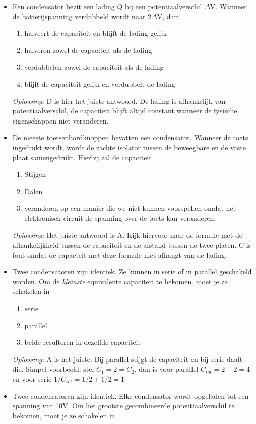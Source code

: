 \documentclass[12pt,a4paper]{article}
\begin{document}
\begin{itemize}
	\item Een condensator bezit een lading Q bij een potentiaalverschil $\Delta$V. Wanneer de batterijspanning verdubbeld wordt naar 2$\Delta$V, dan:
	\begin{enumerate}[label=\alph*]
		\item halveert de capaciteit en blijft de lading gelijk
		\item halveren zowel de capaciteit als de lading
		\item verdubbelen zowel de capaciteit als de lading
		\item blijft de capaciteit gelijk en verdubbelt de lading
	\end{enumerate}
	\textit{Oplossing:} D is hier het juiste antwoord. De lading is afhankelijk van potentiaalverschil, de capaciteit blijft altijd constant wanneer de fysische eigenschappen niet veranderen.
	\item De meeste toetsenbordknoppen bevatten een condensator. Wanneer de toets ingedrukt wordt, wordt de zachte isolator tussen de beweegbare en de vaste plaat samengedrukt. Hierbij zal de capaciteit
	\begin{enumerate}[label=\alph*]
		\item Stijgen
		\item Dalen
		\item veranderen op een manier die we niet kunnen voorspellen omdat het elektronisch circuit de spanning over de toets kan veranderen. 
	\end{enumerate}
	\textit{Oplossing:} Het juiste antwoord is A. Kijk hiervoor naar de formule met de afhankelijkheid tussen de capaciteit en de afstand tussen de twee platen. C is fout omdat de capacteit met deze formule niet afhangt van de lading. 
	\item Twee condensatoren zijn identiek. Ze kunnen in serie of in parallel geschakeld worden. Om de \textit{kleinste} equivalente capaciteit te bekomen, moet je ze schakelen in
	\begin{enumerate}[label=\alph*]
		\item serie
		\item parallel
		\item beide resulteren in dezelfde capaciteit
	\end{enumerate}
	\textit{Oplossing:} A is het juiste. Bij parallel stijgt de capaciteit en bij serie daalt die. Simpel voorbeeld: stel $C_1 = 2 = C_2$, dan is voor parallel \(C_{tot} = 2 + 2 = 4\) en voor serie \(1/C_{tot} = 1/2 + 1/2 = 1\)
	\item Twee condensatoren zijn identiek. Elke condensator wordt opgeladen tot een spanning van 10V. Om het grootste gecombineerde potentiaalverschil te bekomen, moet je ze schakelen in

\end{itemize}
\end{document}
